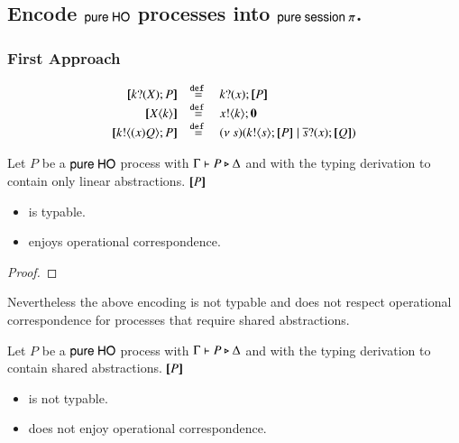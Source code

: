 \subsection{Encode $\mathsf{pure\ HO}$ processes into $\mathsf{pure\ session\ }\pi$.}

\subsubsection{First Approach}

\[
\begin{array}{rcl}
	\map{\binp{k}{\X} P} &\defeq& \binp{k}{x} \map{P}\\
	\map{\appl{\X}{k}} &\defeq& \bout{x}{k} \inact\\
	\map{\bout{k}{\abs{x} Q} P} &\defeq& \newsp{s}{\bout{k}{s} \map{P} \Par \binp{\dual{s}}{x} \map{Q}}
\end{array}
\]

\begin{proposition}
	Let $P$ be a $\mathsf{pure\ HO}$ process with $\Gamma \vdash P \triangleright \Delta$ and
	with the typing derivation to contain only linear abstractions. $[\!\![P]\!\!]$
	\begin{itemize}
		\item	is typable.
		\item	enjoys operational correspondence.
	\end{itemize}

\end{proposition}

\begin{proof}
\end{proof}

Nevertheless the above encoding is not typable and does not respect
operational correspondence for processes that require
shared abstractions.

\begin{proposition}
	Let $P$ be a $\mathsf{pure\ HO}$ process with $\Gamma \vdash P \triangleright \Delta$ and
	with the typing derivation to contain shared abstractions. $[\!\![P]\!\!]$
	\begin{itemize}
		\item	is not typable.
		\item	does not enjoy operational correspondence.
	\end{itemize}
\end{proposition}

